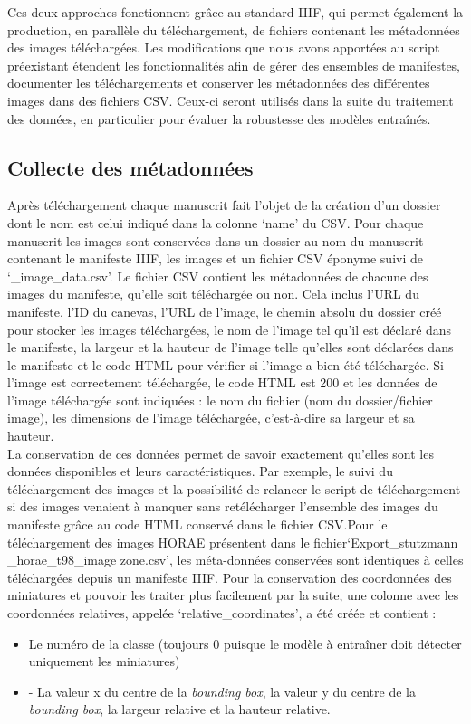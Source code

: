 \documentclass[12pt,twoside]{book}
\begin{document}
Ces deux approches fonctionnent grâce au standard IIIF, qui permet également la production, en parallèle du téléchargement, de fichiers contenant les métadonnées des images téléchargées. Les modifications que nous avons apportées au script préexistant étendent les fonctionnalités afin de gérer des ensembles de manifestes, documenter les téléchargements et conserver les métadonnées des différentes images dans des fichiers CSV. Ceux-ci seront utilisés dans la suite du traitement des données, en particulier pour évaluer la robustesse des modèles entraînés. 

\subsection{Collecte des métadonnées}

Après téléchargement chaque manuscrit fait l’objet de la création d’un dossier dont le nom est celui indiqué dans la colonne ‘name’ du CSV. Pour chaque manuscrit les images sont conservées dans un dossier au nom du manuscrit contenant le manifeste IIIF, les images et un fichier CSV éponyme suivi de ‘\_image\_data.csv’.  Le fichier CSV contient les métadonnées de chacune des images du manifeste, qu’elle soit téléchargée ou non. Cela inclus l'URL du manifeste, l'ID du canevas, l'URL de l'image, le chemin absolu du dossier créé pour stocker les images téléchargées, le nom de l'image tel qu'il est déclaré dans le manifeste, la largeur et la hauteur de l'image telle qu'elles sont déclarées dans le manifeste et le code HTML pour vérifier si l'image a bien été téléchargée. Si l’image est correctement téléchargée, le code HTML est 200 et les données de l’image téléchargée sont indiquées : le nom du fichier (nom du dossier/fichier image), les dimensions de l’image téléchargée, c’est-à-dire sa largeur et sa hauteur. \\

La conservation de ces données permet de savoir exactement qu’elles sont les données disponibles et leurs caractéristiques. Par exemple, le suivi du téléchargement des images et la possibilité de relancer le script de téléchargement si des images venaient à manquer sans retélécharger l’ensemble des images du manifeste grâce au code HTML conservé dans le fichier CSV.Pour le téléchargement des images HORAE présentent dans le fichier‘Export\_stutzmann
\_horae\_t98\_image zone.csv’, les méta-données conservées sont identiques à celles téléchargées depuis un manifeste IIIF. Pour la conservation des coordonnées des miniatures et pouvoir les traiter plus facilement par la suite, une colonne avec les coordonnées relatives, appelée ‘relative\_coordinates’, a été créée et contient : \\
\begin{itemize}
    \item Le numéro de la classe (toujours 0 puisque le modèle à entraîner doit détecter uniquement les miniatures)
    \item -	La valeur x du centre de la \textit{bounding box}, la valeur y du centre de la \textit{bounding box}, la largeur relative et la hauteur relative. 
\end{itemize}
\end{document}
